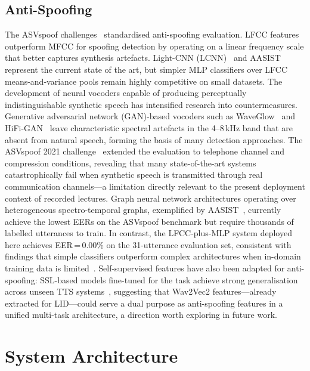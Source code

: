 \documentclass[10pt,twocolumn]{article}
\begin{document}
\subsection{Anti-Spoofing}
The ASVspoof challenges~\cite{nautsch2021asvspoof} standardised anti-spoofing evaluation. LFCC features~\cite{sahidullah2015comparison} outperform MFCC for spoofing detection by operating on a linear frequency scale that better captures synthesis artefacts. Light-CNN (LCNN)~\cite{wu2018light} and AASIST~\cite{jung2022aasist} represent the current state of the art, but simpler MLP classifiers over LFCC means-and-variance pools remain highly competitive on small datasets. The development of neural vocoders capable of producing
perceptually indistinguishable synthetic speech has intensified
research into countermeasures. Generative adversarial network
(GAN)-based vocoders such as WaveGlow~\cite{prenger2019waveglow}
and HiFi-GAN~\cite{kong2020hifi} leave characteristic
spectral artefacts in the 4--8\,kHz band that are absent from
natural speech, forming the basis of many detection approaches.
The ASVspoof 2021 challenge~\cite{yamagishi2021asvspoof}
extended the evaluation to telephone channel and compression
conditions, revealing that many state-of-the-art systems
catastrophically fail when synthetic speech is transmitted through
real communication channels---a limitation directly relevant to
the present deployment context of recorded lectures.
Graph neural network architectures operating over heterogeneous
spectro-temporal graphs, exemplified by AASIST~\cite{jung2022aasist},
currently achieve the lowest EERs on the ASVspoof benchmark but
require thousands of labelled utterances to train. In contrast,
the LFCC-plus-MLP system deployed here achieves EER\,=\,0.00\%
on the 31-utterance evaluation set, consistent with findings
that simple classifiers outperform complex architectures when
in-domain training data is limited~\cite{tak2021end}.
Self-supervised features have also been adapted for anti-spoofing:
SSL-based models fine-tuned for the task achieve strong
generalisation across unseen TTS systems~\cite{wang2021investigating},
suggesting that Wav2Vec2 features---already extracted for
LID---could serve a dual purpose as anti-spoofing features
in a unified multi-task architecture, a direction worth
exploring in future work.

\section{System Architecture}\label{sec:arch}
\end{document}
